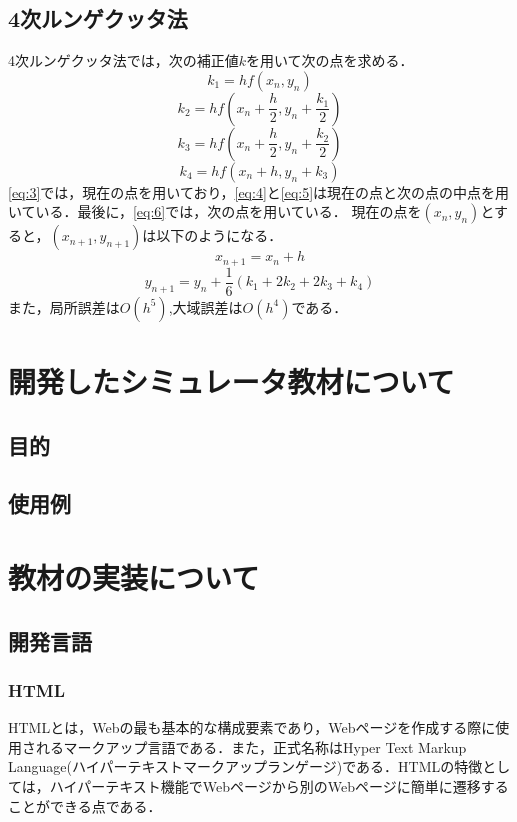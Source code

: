 \documentclass[a4paper, 12pt]{ltjsarticle}
\begin{document}
\subsection{4次ルンゲクッタ法}
4次ルンゲクッタ法では，次の補正値$k$を用いて次の点を求める．
\begin{equation}
  k_1=hf(x_n,y_n)\label{eq:3}
\end{equation}
\begin{equation}
  k_2=hf(x_n+\frac{h}{2},y_n+\frac{k_1}{2})\label{eq:4}
\end{equation}
\begin{equation}
  k_3=hf(x_n+\frac{h}{2},y_n+\frac{k_2}{2})\label{eq:5}
\end{equation}
\begin{equation}
  k_4=hf(x_n+h,y_n+k_3)\label{eq:6}
\end{equation}
\eqref{eq:3}では，現在の点を用いており，\eqref{eq:4}と\eqref{eq:5}は現在の点と次の点の中点を用いている．最後に，\eqref{eq:6}では，次の点を用いている．
現在の点を$(x_n,y_n)$とすると，$(x_{n+1},y_{n+1})$は以下のようになる．
\begin{equation}
  x_{n+1}=x_n+h
\end{equation}
\begin{equation}
  y_{n+1}=y_n+\frac{1}{6}(k_1+2k_2+2k_3+k_4)
\end{equation}
また，局所誤差は$O(h^5)$,大域誤差は$O(h^4)$である．
\clearpage
\section{開発したシミュレータ教材について}
\subsection{目的}
\subsection{使用例}
\clearpage
\section{教材の実装について}
\subsection{開発言語}
\subsubsection{HTML}
HTMLとは，Webの最も基本的な構成要素であり，Webページを作成する際に使用されるマークアップ言語である．また，正式名称はHyper Text Markup Language(ハイパーテキストマークアップランゲージ)である．HTMLの特徴としては，ハイパーテキスト機能でWebページから別のWebページに簡単に遷移することができる点である．
\end{document}
